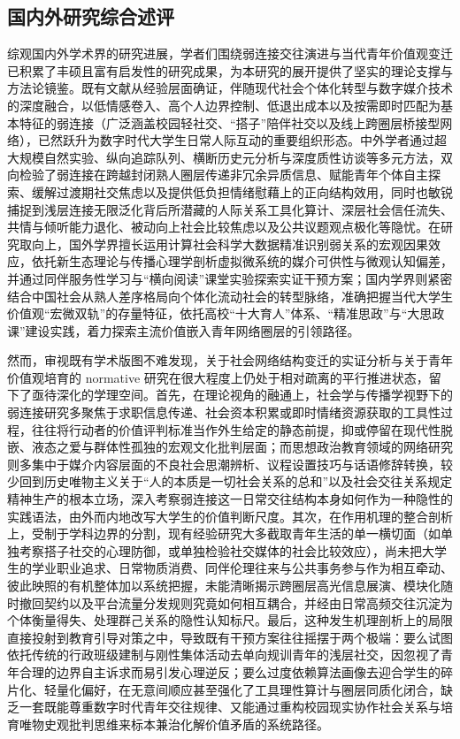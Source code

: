 \subsection{国内外研究综合述评}
\label{sec:research-review}

综观国内外学术界的研究进展，学者们围绕弱连接交往演进与当代青年价值观变迁已积累了丰硕且富有启发性的研究成果，为本研究的展开提供了坚实的理论支撑与方法论镜鉴。既有文献从经验层面确证，伴随现代社会个体化转型与数字媒介技术的深度融合，以低情感卷入、高个人边界控制、低退出成本以及按需即时匹配为基本特征的弱连接（广泛涵盖校园轻社交、“搭子”陪伴社交以及线上跨圈层桥接型网络），已然跃升为数字时代大学生日常人际互动的重要组织形态。中外学者通过超大规模自然实验、纵向追踪队列、横断历史元分析与深度质性访谈等多元方法，双向检验了弱连接在跨越封闭熟人圈层传递非冗余异质信息、赋能青年个体自主探索、缓解过渡期社交焦虑以及提供低负担情绪慰藉上的正向结构效用，同时也敏锐捕捉到浅层连接无限泛化背后所潜藏的人际关系工具化算计、深层社会信任流失、共情与倾听能力退化、被动向上社会比较焦虑以及公共议题观点极化等隐忧。在研究取向上，国外学界擅长运用计算社会科学大数据精准识别弱关系的宏观因果效应，依托新生态理论与传播心理学剖析虚拟微系统的媒介可供性与微观认知偏差，并通过同伴服务性学习与“横向阅读”课堂实验探索实证干预方案；国内学界则紧密结合中国社会从熟人差序格局向个体化流动社会的转型脉络，准确把握当代大学生价值观“宏微双轨”的存量特征，依托高校“十大育人”体系、“精准思政”与“大思政课”建设实践，着力探索主流价值嵌入青年网络圈层的引领路径。

然而，审视既有学术版图不难发现，关于社会网络结构变迁的实证分析与关于青年价值观培育的 normative 研究在很大程度上仍处于相对疏离的平行推进状态，留下了亟待深化的学理空间。首先，在理论视角的融通上，社会学与传播学视野下的弱连接研究多聚焦于求职信息传递、社会资本积累或即时情绪资源获取的工具性过程，往往将行动者的价值评判标准当作外生给定的静态前提，抑或停留在现代性脱嵌、液态之爱与群体性孤独的宏观文化批判层面；而思想政治教育领域的网络研究则多集中于媒介内容层面的不良社会思潮辨析、议程设置技巧与话语修辞转换，较少回到历史唯物主义关于“人的本质是一切社会关系的总和”以及社会交往关系规定精神生产的根本立场，深入考察弱连接这一日常交往结构本身如何作为一种隐性的实践语法，由外而内地改写大学生的价值判断尺度。其次，在作用机理的整合剖析上，受制于学科边界的分割，现有经验研究大多截取青年生活的单一横切面（如单独考察搭子社交的心理防御，或单独检验社交媒体的社会比较效应），尚未把大学生的学业职业追求、日常物质消费、同伴伦理往来与公共事务参与作为相互牵动、彼此映照的有机整体加以系统把握，未能清晰揭示跨圈层高光信息展演、模块化随时撤回契约以及平台流量分发规则究竟如何相互耦合，并经由日常高频交往沉淀为个体衡量得失、处理群己关系的隐性认知标尺。最后，这种发生机理剖析上的局限直接投射到教育引导对策之中，导致既有干预方案往往摇摆于两个极端：要么试图依托传统的行政班级建制与刚性集体活动去单向规训青年的浅层社交，因忽视了青年合理的边界自主诉求而易引发心理逆反；要么过度依赖算法画像去迎合学生的碎片化、轻量化偏好，在无意间顺应甚至强化了工具理性算计与圈层同质化闭合，缺乏一套既能尊重数字时代青年交往规律、又能通过重构校园现实协作社会关系与培育唯物史观批判思维来标本兼治化解价值矛盾的系统路径。